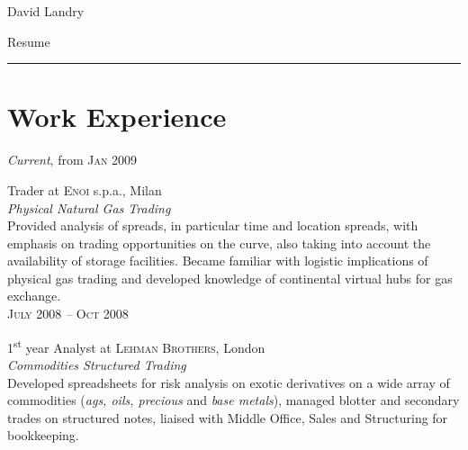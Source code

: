 \documentclass[10pt]{article}
\begin{document}
\color{text1} %

	\par{\centering
		{\sffamily\Huge David Landry
	}\\	
	{\color{headings} 
			{\Huge Resume}
		\\[25pt]\par}
	{\color{white} \hrule} %
	
\begin{minipage}[t]{0.5\textwidth} %

	\vspace{0pt}	%
	
\section{Work Experience}

	\raggedleft
	\emph{Current}, from \textsc{Jan 2009}\par

	\raggedright\large Trader at \textsc{Enoi} s.p.a., Milan\\
	\emph{Physical Natural Gas Trading}\\[5pt]

	\normalsize{Provided analysis of spreads, in particular time and location spreads, with emphasis on trading opportunities on the curve, also taking into account the availability of storage facilities. Became familiar with logistic implications of physical gas trading and developed knowledge of continental virtual hubs for gas exchange.}\\[10pt]

	\raggedleft
	\textsc{\normalsize July 2008 \emph{--} Oct 2008}\par

	\raggedright
	\large 1\textsuperscript{st} year Analyst at \textsc{Lehman Brothers}, London\\
\emph{Commodities Structured Trading}\\[5pt]

\normalsize{Developed spreadsheets for risk analysis on exotic derivatives on a wide array of commodities (\textit{ags, oils, precious} and \textit{base metals}), managed blotter and secondary trades on structured notes, liaised with Middle Office, Sales and Structuring for bookkeeping.}\\[10pt]


\end{minipage}}
\end{document}
